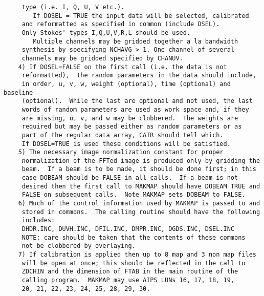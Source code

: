 \begin{verbatim}
     type (i.e. I, Q, U, V etc.).
        If DOSEL = TRUE the input data will be selected, calibrated
     and reformatted as specified in common (include DSEL).
     Only Stokes' types I,Q,U,V,R,L should be used.
        Multiple channels may be gridded together a la bandwidth
     synthesis by specifying NCHAVG > 1. One channel of several
     channels may be gridded specified by CHANUV.
    4) If DOSEL=FALSE on the first call (i.e. the data is not
     reformatted),  the random parameters in the data should include,
     in order, u, v, w, weight (optional), time (optional) and baseline
     (optional).  While the last are optional and not used, the last
     words of random parameters are used as work space and, if they
     are missing, u, v, and w may be clobbered.  The weights are
     required but may be passed either as random parameters or as
     part of the regular data array, CATR should tell which.
     If DOSEL=TRUE is used these conditions will be satisfied.
    5) The necessary image normalization constant for proper
     normalization of the FFTed image is produced only by gridding the
     beam.  If a beam is to be made, it should be done first; in this
     case DOBEAM should be FALSE in all calls.  If a beam is not
     desired then the first call to MAKMAP should have DOBEAM TRUE and
     FALSE on subsequent calls.  Note MAKMAP sets DOBEAM to FALSE.
    6) Much of the control information used by MAKMAP is passed to and
     stored in commons.  The calling routine should have the following
     includes:
     DHDR.INC, DUVH.INC, DFIL.INC, DMPR.INC, DGDS.INC, DSEL.INC
     NOTE: care should be taken that the contents of these commons
     not be clobbered by overlaying.
    7) If calibration is applied then up to 8 map and 3 non map files
     will be open at once; this should be reflected in the call to
     ZDCHIN and the dimension of FTAB in the main routine of the
     calling program.  MAKMAP may use AIPS LUNs 16, 17, 18, 19,
     20, 21, 22, 23, 24, 25, 28, 29, 30.
\end{verbatim}

